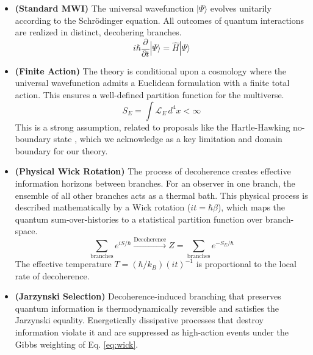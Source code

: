 \documentclass[aps,prl,twocolumn,superscriptaddress,longbibliography]{revtex4-2}
\begin{document}
\begin{itemize}
    \item[\textbf{A1}] \textbf{(Standard MWI)} The universal wavefunction $|\Psi\rangle$ evolves unitarily according to the Schrödinger equation. All outcomes of quantum interactions are realized in distinct, decohering branches.
    \begin{equation}
        i\hbar \frac{\partial}{\partial t}|\Psi\rangle = \hat{H}|\Psi\rangle
        \label{eq:schrodinger}
    \end{equation}

    \item[\textbf{A2}] \textbf{(Finite Action)} The theory is conditional upon a cosmology where the universal wavefunction admits a Euclidean formulation with a finite total action. This ensures a well-defined partition function for the multiverse.
    \begin{equation}
        S_E = \int \mathcal{L}_E \, d^4x < \infty
        \label{eq:finite_action}
    \end{equation}
    This is a strong assumption, related to proposals like the Hartle-Hawking no-boundary state \cite{Hartle1983}, which we acknowledge as a key limitation and domain boundary for our theory.

    \item[\textbf{A3}] \textbf{(Physical Wick Rotation)} The process of decoherence creates effective information horizons between branches. For an observer in one branch, the ensemble of all other branches acts as a thermal bath. This physical process is described mathematically by a Wick rotation ($it = \hbar\beta$), which maps the quantum sum-over-histories to a statistical partition function over branch-space.
    \begin{equation}
        \sum_{\text{branches}} e^{iS/\hbar} \xrightarrow{\text{Decoherence}} Z = \sum_{\text{branches}} e^{-S_E/\hbar}
        \label{eq:wick}
    \end{equation}
    The effective temperature $T = (\hbar/k_B)(it)^{-1}$ is proportional to the local rate of decoherence.

    \item[\textbf{A4}] \textbf{(Jarzynski Selection)} Decoherence-induced branching that preserves quantum information is thermodynamically reversible and satisfies the Jarzynski equality. Energetically dissipative processes that destroy information violate it and are suppressed as high-action events under the Gibbs weighting of Eq. \ref{eq:wick}.


\end{itemize}
\end{document}
